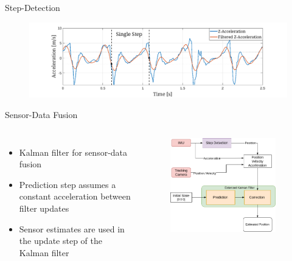 \documentclass[aspectratio=169]{beamer}
\begin{document}
{\begin{frame}{Step-Detection}
		\vspace{0.5cm}
		\begin{figure}
			\centering
			\includegraphics[width=0.9\linewidth]{../Conference_Paper/WalkAcceleration}
		\end{figure}
		
		
		
	\end{frame}
	
	\begin{frame}{Sensor-Data Fusion}
		\begin{columns}
				\begin{itemize}
				\item Kalman filter for sensor-data fusion
				\item Prediction step assumes a constant acceleration between filter updates 
				\item Sensor estimates are used in the update step of the Kalman filter
			\end{itemize}
			\begin{figure}
				\centering
				\includegraphics[width=0.9\textwidth]{schema1.png}
			\end{figure}
		\end{columns}
	

\end{frame}}
\end{document}
